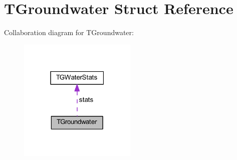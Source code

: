 \hypertarget{struct_t_groundwater}{}\section{T\+Groundwater Struct Reference}
\label{struct_t_groundwater}


Collaboration diagram for T\+Groundwater\+:
\nopagebreak
\begin{figure}[H]
\begin{center}
\leavevmode
\includegraphics[width=159pt]{d3/d08/struct_t_groundwater__coll__graph}
\end{center}
\end{figure}
